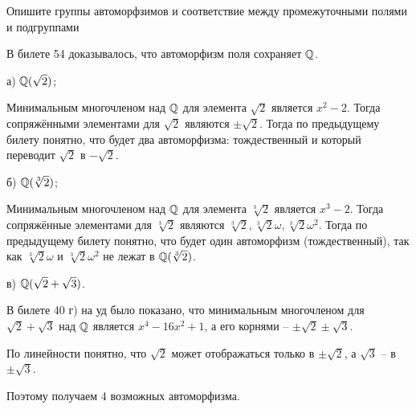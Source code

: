 Опишите группы автоморфзимов и соответствие между промежуточными полями и подгруппами 

В билете 54 доказывалось, что автоморфизм поля сохраняет $\mathbb{Q}$.

а) $\mathbb{Q}(\sqrt{2})$; 

Минимальным многочленом над $\mathbb{Q}$ для элемента $\sqrt{2}$ является
$x^2 - 2$. Тогда сопряжёнными элементами для $\sqrt{2}$ являются
$\pm \sqrt{2}$. Тогда по предыдущему билету понятно, что будет
два автоморфизма: тождественный и который переводит 
$\sqrt{2}$ в $-\sqrt{2}$.

б) $\mathbb{Q}(\sqrt[3]{2})$; 

Минимальным многочленом над $\mathbb{Q}$ для элемента $\sqrt[3]{2}$ является
$x^3 - 2$. Тогда сопряжённые элементами для $\sqrt[3]{2}$ являются
$\sqrt[3]{2}, \sqrt[3]{2} \omega, \sqrt[3]{2} \omega^2$. 
Тогда по предыдущему билету понятно, что будет один автоморфизм
(тождественный), так как $\sqrt[3]{2} \omega$ и $\sqrt[3]{2} \omega^2$
не лежат в $\mathbb{Q}(\sqrt[3]{2})$.

в) $\mathbb{Q}(\sqrt{2} + \sqrt{3})$.

В билете 40 г) на уд было показано, что минимальным многочленом 
для $\sqrt{2} + \sqrt{3}$ над $\mathbb{Q}$ является
$x^4 - 16x^2 + 1$, а его корнями -- $\pm \sqrt{2} \pm \sqrt{3}$.

По линейности понятно, что $\sqrt{2}$ может отображаться только в
$\pm \sqrt{2}$, а $\sqrt{3}$ -- в $\pm \sqrt{3}$.

Поэтому получаем 4 возможных автоморфизма.
